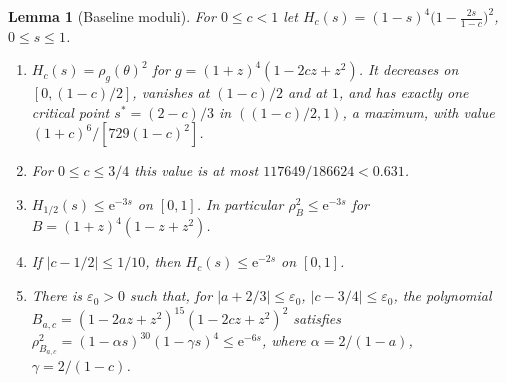 \documentclass[11pt]{article}
\newtheorem{alemma}{Lemma}[section]
\theoremstyle{remark}\newtheorem{remark}[theorem]{Remark}
\newcommand{\ee}{\mathrm e}
\begin{document}
\begin{alemma}[Baseline moduli]\label{lem:baseline}
For \(0\le c<1\) let
\(H_c(s)=(1-s)^4\bigl(1-\tfrac{2s}{1-c}\bigr)^2\), \(0\le s\le1\).
\begin{enumerate}
\item[(a)] \(H_c(s)=\rho_g(\theta)^2\) for \(g=(1+z)^4(1-2cz+z^2)\).
 It decreases on \([0,(1-c)/2]\), vanishes at \((1-c)/2\) and at \(1\),
 and has exactly one critical point \(s^*=(2-c)/3\) in
 \(((1-c)/2,1)\), a maximum, with value
 \((1+c)^6/[729(1-c)^2]\).
\item[(b)] For \(0\le c\le3/4\) this value is at most
 \(117649/186624<0.631\).
\item[(c)] \(H_{1/2}(s)\le\ee^{-3s}\) on \([0,1]\). In particular
 \(\rho_B^2\le\ee^{-3s}\) for \(B=(1+z)^4(1-z+z^2)\).
\item[(d)] If \(|c-1/2|\le1/10\), then \(H_c(s)\le\ee^{-2s}\) on \([0,1]\).
\item[(e)] There is \(\varepsilon_0>0\) such that, for
 \(|a+2/3|\le\varepsilon_0\), \(|c-3/4|\le\varepsilon_0\), the
 polynomial \(B_{a,c}=(1-2az+z^2)^{15}(1-2cz+z^2)^2\) satisfies
 \(\rho_{B_{a,c}}^2=(1-\alpha s)^{30}(1-\gamma s)^4\le\ee^{-6s}\),
 where \(\alpha=2/(1-a)\), \(\gamma=2/(1-c)\).
\end{enumerate}
\end{alemma}
\end{document}
